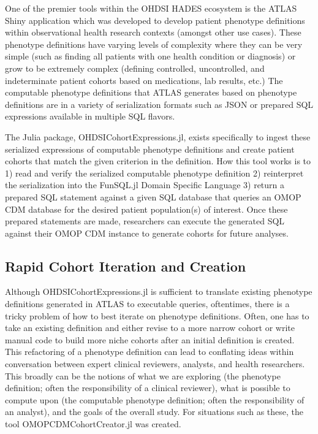 \documentclass{juliacon}
\begin{document}
One of the premier tools within the OHDSI HADES ecosystem is the ATLAS Shiny application which was developed to develop patient phenotype definitions within observational health research contexts (amongst other use cases).
These phenotype definitions have varying levels of complexity where they can be very simple (such as finding all patients with one health condition or diagnosis) or grow to be extremely complex (defining controlled, uncontrolled, and indeterminate patient cohorts based on medications, lab results, etc.)
The computable phenotype definitions that ATLAS generates based on phenotype definitions are in a variety of serialization formats such as JSON or prepared SQL expressions available in multiple SQL flavors.

The Julia package, OHDSICohortExpressions.jl, exists specifically to ingest these serialized expressions of computable phenotype definitions and create patient cohorts that match the given criterion in the definition.
How this tool works is to 1) read and verify the serialized computable phenotype definition 2) reinterpret the serialization into the FunSQL.jl Domain Specific Language 3) return a prepared SQL statement against a given SQL database that queries an OMOP CDM database for the desired patient population(s) of interest.
Once these prepared statements are made, researchers can execute the generated SQL against their OMOP CDM instance to generate cohorts for future analyses.

\subsection{Rapid Cohort Iteration and Creation}

Although OHDSICohortExpressions.jl is sufficient to translate existing phenotype definitions generated in ATLAS to executable queries, oftentimes, there is a tricky problem of how to best iterate on phenotype definitions. \cite{zelkoDevelopingRobustComputable2023}
Often, one has to take an existing definition and either revise to a more narrow cohort or write manual code to build more niche cohorts after an initial definition is created.
This refactoring of a phenotype definition can lead to conflating ideas within conversation between expert clinical reviewers, analysts, and health researchers.
This broadly can be the notions of what we are exploring (the phenotype definition; often the responsibility of a clinical reviewer), what is possible to compute upon (the computable phenotype definition; often the responsibility of an analyst), and the goals of the overall study.
For situations such as these, the tool OMOPCDMCohortCreator.jl was created.
\end{document}
